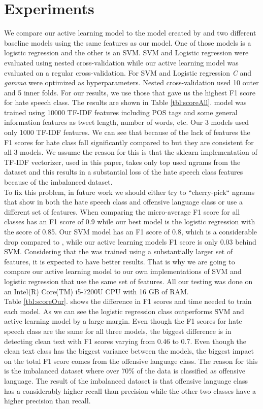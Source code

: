 \documentclass[10pt, a4paper]{article}
\begin{document}
	\section{Experiments}
	We compare our active learning model to the model created by \citet{Davidson2017AutomatedHS} and two different baseline models using the same features as our model. One of those models is a logistic regression and the other is an SVM. SVM and Logistic regression were evaluated using nested cross-validation while our active learning model was evaluated on a regular cross-validation. For SVM and Logistic regression \textit{C} and \textit{gamma} were optimized as hyperparameters. Nested cross-validation used 10 outer and 5 inner folds. For our results, we use those that gave us the highest F1 score for hate speech class. The results are shown in Table \ref{tbl:scoreAll}. \citet{Davidson2017AutomatedHS} model was trained using 10000 TF-IDF features including POS tags and some general information features as tweet length, number of words, etc. Our 3 models used only 1000 TF-IDF features. We can see that because of the lack of features the F1 scores for hate class fall significantly compared to \citet{Davidson2017AutomatedHS} but they are consistent for all 3 models. We assume the reason for this is that the sklearn implementation of TF-IDF vectorizer, used in this paper, takes only top used ngrams from the dataset and this results in a substantial loss of the hate speech class features because of the imbalanced dataset.  
	\\To fix this problem, in future work we should either try to “cherry-pick“ ngrams that show in both the hate speech class and offensive language class or use a different set of features. When comparing the micro-average F1 score for all classes \citet{Davidson2017AutomatedHS} has an F1 score of 0.9 while our best model is the logistic regression with the score of 0.85. Our SVM model has an F1 score of 0.8, which is a considerable drop compared to \citet{Davidson2017AutomatedHS}, while our active learning models F1 score is only 0.03 behind SVM. Considering that the \citet{Davidson2017AutomatedHS} was trained using a substantially larger set of features, it is expected to have better results. That is why we are going to compare our active learning model to our own implementations of SVM and logistic regression that use the same set of features. All our testing was done on an Intel(R) Core(TM) i5-7200U CPU with 16 GB of RAM. 
	\\Table \ref{tbl:scoreOur}. shows the difference in F1 scores and time needed to train each model. As we can see the logistic regression class outperforms SVM and active learning model by a large margin. Even though the F1 scores for hate speech class are the same for all three models, the biggest difference is in detecting clean text with F1 scores varying from 0.46 to 0.7. Even though the clean text class has the biggest variance between the models, the biggest impact on the total F1 score comes from the offensive language class. The reason for this is the imbalanced dataset where over 70\% of the data is classified as offensive language. The result of the imbalanced dataset is that offensive language class has a considerably higher recall than precision while the other two classes have a higher precision than recall.
\end{document}

